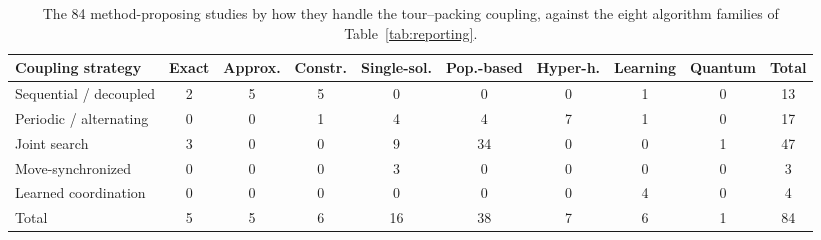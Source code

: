 \begin{table}[htbp]
\centering
\footnotesize
\caption{The 84 method-proposing studies by how they handle the tour--packing coupling, against the eight algorithm families of Table~\ref{tab:reporting}.}
\label{tab:coupling}
\begin{tabular}{@{}lccccccccc@{}}
\toprule
\textbf{Coupling strategy} & \textbf{Exact} & \textbf{Approx.} & \textbf{Constr.} & \textbf{Single-sol.} & \textbf{Pop.-based} & \textbf{Hyper-h.} & \textbf{Learning} & \textbf{Quantum} & \textbf{Total} \\
\midrule
Sequential / decoupled & 2 & 5 & 5 & 0 & 0 & 0 & 1 & 0 & 13 \\
Periodic / alternating & 0 & 0 & 1 & 4 & 4 & 7 & 1 & 0 & 17 \\
Joint search & 3 & 0 & 0 & 9 & 34 & 0 & 0 & 1 & 47 \\
Move-synchronized & 0 & 0 & 0 & 3 & 0 & 0 & 0 & 0 & 3 \\
Learned coordination & 0 & 0 & 0 & 0 & 0 & 0 & 4 & 0 & 4 \\
\midrule
Total & 5 & 5 & 6 & 16 & 38 & 7 & 6 & 1 & 84 \\
\bottomrule
\end{tabular}
\end{table}
